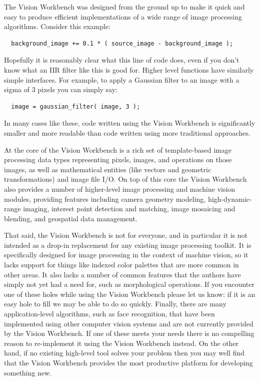The Vision Workbench was designed from the ground up to make it quick
and easy to produce efficient implementations of a wide range of image
processing algorithms.  Consider this example:
\begin{verbatim}
  background_image += 0.1 * ( source_image - background_image );
\end{verbatim}
Hopefully it is reasonably clear what this line of code does, even 
if you don't know what an IIR filter like this is good for.  Higher 
level functions have similarly simple interfaces.  For example, to 
apply a Gaussian filter to an image with a sigma of 3 pixels you 
can simply say:
\begin{verbatim}
  image = gaussian_filter( image, 3 );
\end{verbatim}
In many cases like these, code written using the Vision Workbench is
significantly smaller and more readable than code written using more
traditional approaches.

At the core of the Vision Workbench is a rich set of template-based
image processing data types representing pixels, images, and
operations on those images, as well as mathematical entities (like
vectors and geometric transformations) and image file I/O.  On top of
this core the Vision Workbench also provides a number of higher-level
image processing and machine vision modules, providing features
including camera geometry modeling, high-dynamic-range imaging,
interest point detection and matching, image mosaicing and blending,
and geospatial data management.

That said, the Vision Workbench is not for everyone, and in particular
it is not intended as a drop-in replacement for any existing image
processing toolkit.  It is specifically designed for image processing
in the context of machine vision, so it lacks support for things like
indexed color palettes that are more common in other areas.  It also
lacks a number of common features that the authors have simply not yet
had a need for, such as morphological operations.  If you encounter one
of these holes while using the Vision Workbench please let us know: if
it is an easy hole to fill we may be able to do so quickly.  Finally,
there are many application-level algorithms, such as face recognition,
that have been implemented using other computer vision systems and are
not currently provided by the Vision Workbench.  If one of these meets
your needs there is no compelling reason to re-implement it using the
Vision Workbench instead.  On the other hand, if no existing
high-level tool solves your problem then you may well find that the
Vision Workbench provides the most productive platform for developing
something new.


